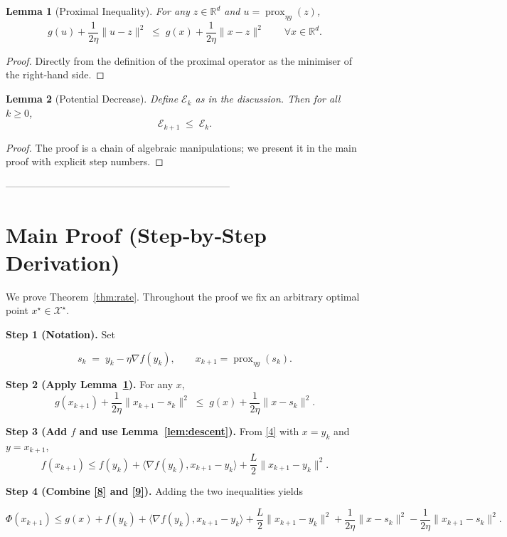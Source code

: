 \documentclass{article}
\newtheorem{lemma}{Lemma}
\newcommand{\prox}{\operatorname{prox}}
\newcommand{\R}{\mathbb{R}}
\begin{document}
\begin{lemma}[Proximal Inequality]\label{lem:prox}
For any $z\in\R^{d}$ and $u=\prox_{\eta g}(z)$,
\[
g(u)+\frac{1}{2\eta}\|u-z\|^{2}\;\le\;g(x)+\frac{1}{2\eta}\|x-z\|^{2}
\qquad\forall x\in\R^{d}.
\tag{5}
\]
\end{lemma}
\begin{proof}
Directly from the definition of the proximal operator as the minimiser of the right‑hand side.
\end{proof}

\begin{lemma}[Potential Decrease]\label{lem:potential}
Define $\mathcal{E}_k$ as in the discussion. Then for all $k\ge0$,
\[
\mathcal{E}_{k+1}\;\le\;\mathcal{E}_{k}.
\tag{6}
\]
\end{lemma}
\begin{proof}
The proof is a chain of algebraic manipulations; we present it in the main proof with explicit step numbers.
\end{proof}

--------------------------------------------------------------------

\section*{Main Proof (Step‑by‑Step Derivation)}
We prove Theorem~\ref{thm:rate}. Throughout the proof we fix an arbitrary optimal point $x^\star\in\mathcal{X}^\star$.

\noindent\textbf{Step 1 (Notation).} Set  

\[
s_k \;=\; y_k-\eta\nabla f(y_k),\qquad 
x_{k+1}= \prox_{\eta g}(s_k).
\tag{7}
\]

\noindent\textbf{Step 2 (Apply Lemma~\ref{lem:prox}).} For any $x$,
\[
g(x_{k+1})+\frac{1}{2\eta}\|x_{k+1}-s_k\|^{2}
\;\le\;
g(x)+\frac{1}{2\eta}\|x-s_k\|^{2}.
\tag{8}
\]

\noindent\textbf{Step 3 (Add $f$ and use Lemma~\ref{lem:descent}).}  
From \eqref{4} with $x=y_k$ and $y=x_{k+1}$,
\[
f(x_{k+1}) \le f(y_k)+\langle\nabla f(y_k),x_{k+1}-y_k\rangle
          +\frac{L}{2}\|x_{k+1}-y_k\|^{2}.
\tag{9}
\]

\noindent\textbf{Step 4 (Combine \eqref{8} and \eqref{9}).} Adding the two inequalities yields  

\[
\Phi(x_{k+1})\le
g(x)+f(y_k)+\langle\nabla f(y_k),x_{k+1}-y_k\rangle
+\frac{L}{2}\|x_{k+1}-y_k\|^{2}
+\frac{1}{2\eta}\|x-s_k\|^{2}
-\frac{1}{2\eta}\|x_{k+1}-s_k\|^{2}.
\tag{10}
\]
\end{document}
